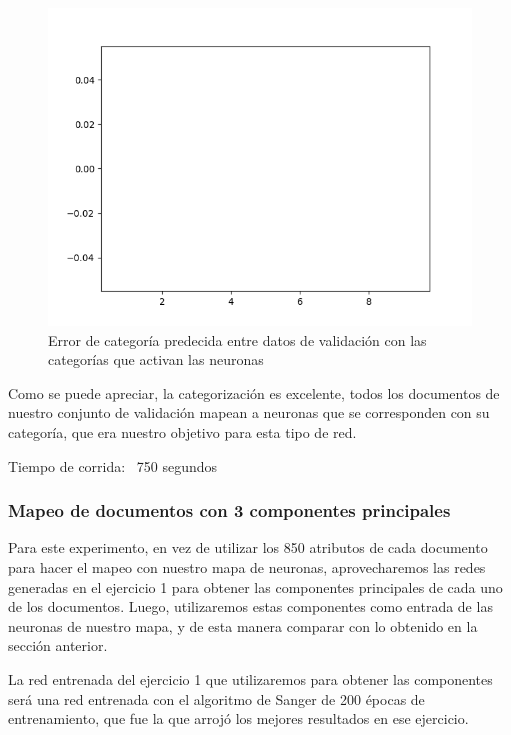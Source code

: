 \begin{figure}[!htbp]
  \begin{center}
    \includegraphics[scale=0.6]{../img/map7x7_1000ep_850en_sigma7_faseord750_corregido_errores.png}
  \caption{Error de categoría predecida entre datos de validación con las categorías que activan las neuronas}
  \end{center}
\end{figure}

Como se puede apreciar, la categorización es excelente, todos los documentos de nuestro conjunto de validación mapean a neuronas que se corresponden con su categoría, que era nuestro objetivo para esta tipo de red.

Tiempo de corrida: ~750 segundos

\subsubsection{Mapeo de documentos con 3 componentes principales}

Para este experimento, en vez de utilizar los 850 atributos de cada documento para hacer el mapeo con nuestro mapa de neuronas, aprovecharemos las redes generadas en el ejercicio 1 para obtener las componentes principales de cada uno de los documentos. Luego, utilizaremos estas componentes como entrada de las neuronas de nuestro mapa, y de esta manera comparar con lo obtenido en la sección anterior. 

La red entrenada del ejercicio 1 que utilizaremos para obtener las componentes será una red entrenada con el algoritmo de Sanger de 200 épocas de entrenamiento, que fue la que arrojó los mejores resultados en ese ejercicio.


